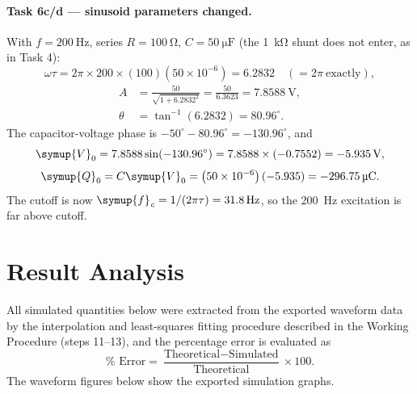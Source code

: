 \documentclass[12pt,a4paper]{article}
\begin{document}
	\paragraph{Task 6c/d --- sinusoid parameters changed.}
	With $f = \SI{200}{\hertz}$, series $R = \SI{100}{\ohm}$,
	$C = \SI{50}{\micro\farad}$ (the \SI{1}{\kilo\ohm} shunt does not
	enter, as in Task 4):
	\begin{equation}
		\omega\tau = 2\pi \times 200 \times (100)\left(50\times 10^{-6}\right)
		= 6.2832 \quad \left(= 2\pi\ \text{exactly}\right),
	\end{equation}
	\begin{align}
		A &= \frac{50}{\sqrt{1 + 6.2832^2}}
		= \frac{50}{6.3623} = \SI{7.8588}{\volt},\\
		\theta &= \tan^{-1}(6.2832) = 80.96^{\circ}.
	\end{align}
	The capacitor-voltage phase is $-50^\circ - 80.96^\circ =
	-130.96^\circ$, and
	\begin{equation}
		\symup{V}_{0} = 7.8588 \sin(-130.96^{\circ})
		= 7.8588 \times (-0.7552) = \SI{-5.935}{\volt},
	\end{equation}
	\begin{equation}
		\symup{Q}_{0} = C \symup{V}_{0} = \left(50\times 10^{-6}\right)(-5.935)
		= \SI{-296.75}{\micro\coulomb}.
	\end{equation}
	The cutoff is now $\symup{f}_{\mathit{c}} = 1/(2\pi\tau) = \SI{31.8}{\hertz}$, so the
	\SI{200}{\hertz} excitation is far above cutoff.
	
	\section{Result Analysis}
	\label{sec:results}
	All simulated quantities below were extracted from the exported
	waveform data by the interpolation and least-squares fitting
	procedure described in the Working Procedure (steps 11--13), and the
	percentage error is evaluated as
	\begin{equation}
		\% \text{ Error} =
		\frac{\text{Theoretical} - \text{Simulated}}{\text{Theoretical}}
		\times 100 .
		\label{eq:perr}
	\end{equation}
	The waveform figures below show the exported simulation graphs.
	
\end{document}
